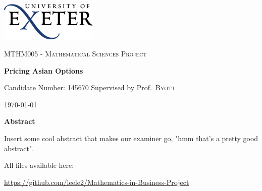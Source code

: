 \begin{titlepage}
	\centering
	\includegraphics[width=0.35\textwidth]{Title/logo.png} \par
	\vspace{0.25cm}
	{\scshape\Large MTHM005 - Mathematical Sciences Project\par}
	\vspace{0.5cm}
	{\huge\bfseries Pricing Asian Options\par}
    \vspace{0.10cm}
	{\Large Candidate Number: 145670}
	\vspace{0.2cm}
	\flushleft
	Supervised by	Prof.~\textsc{Byott} \hfill	{\large \today\par}
    \par
    \centering
	{\large \textbf{Abstract}}
	\par
    
    Insert some cool abstract that makes our examiner go, "hmm that's a pretty good abstract".

    \vfill
    All files available here: \par \small{\url{https://github.com/leele2/Mathematics-in-Business-Project}}
\end{titlepage}